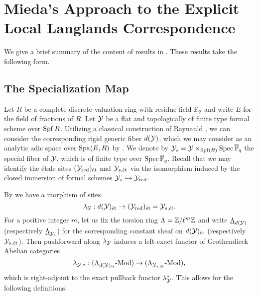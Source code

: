 \documentclass[../main.tex]{subfiles}
\begin{document}
\section{Mieda's Approach to the Explicit Local Langlands Correspondence} %
\label{sec:Mieda's Approach to the Explicit Local Langlands Correspondence}

We give a brief summary of the content of results in \cite{mieda2016geometric}.
These results take the following form. 

\subsection{The Specialization Map} %
\label{sub:The Injectivity FinLevel}
Let $R$ be a complete discrete valuation ring with residue field ${\overline {\mathbb{F}}_q}$ and
write $E$ for the field of fractions of $R$.
Let $\mathcal{Y}$ be a flat and topologically of finite type formal scheme over $\operatorname{Spf} R$.
Utilizing a classical construction of Raynauld \cite{raynaud1974geometrie}, we 
can consider the corresponding rigid generic fiber $d(\mathcal{Y})$, which we may
consider as an analytic adic space over $\operatorname{Spa}(E,R)$ by \cite[Section
1.9]{huber2013etale}. We denote by $\mathcal{Y}_s = \mathcal{Y} \times_{\operatorname{Spf}(R)} \operatorname{Spec}
{\overline {\mathbb{F}}_q}$ the special fiber of $\mathcal{Y}$, which is of finite type over $\operatorname{Spec}
{\overline {\mathbb{F}}_q}$. Recall that we may identify the \'etale sites $(\mathcal{Y}_{\mathrm{red}})_{\textnormal{\'et}}$ and
$\mathcal{Y}_{s,\textnormal{\'et}}$ via the isomorphism induced by the closed immersion of formal schemes
$\mathcal{Y}_s \hookrightarrow \mathcal{Y}_{\mathrm{red}}$.

By \cite[Lemma 3.5.1]{huber2013etale} we have a morphism of sites
\begin{equation*}
  \lambda_{\mathcal{Y}} : d(\mathcal{Y})_{\textnormal{\'et}} \to (\mathcal{Y}_{\mathrm{red}})_{\textnormal{\'et}} = \mathcal{Y}_{s, \textnormal{\'et}}.
\end{equation*}
For a positive integer $m$, let us fix the torsion ring $\Lambda = \mathbb{Z}/\ell^m
\mathbb{Z}$ and write $\underline \Lambda_{d(\mathcal{Y})}$ (respectively $\underline
\Lambda_{\mathcal{Y}_{s}}$)
for the corresponding constant sheaf on $d(\mathcal{Y})_{\textnormal{\'et}}$ (respectively $\mathcal{Y}_{s,\textnormal{\'et}}$). Then 
pushforward along $\lambda_{\mathcal{Y}}$ induces a left-exact functor of Grothendieck
Abelian categories
\begin{equation*}
  \lambda_{\mathcal{Y},*}: {({\underline \Lambda_{d(\mathcal{Y})_{\textnormal{\'et}}}}\text-\allowbreak\mathrm{Mod})} \to {({\underline \Lambda_{\mathcal{Y}_{s, \textnormal{\'et}}}}\text-\allowbreak\mathrm{Mod})},
\end{equation*}
which is right-adjoint to the exact pullback functor $\lambda_{\mathcal{Y}}^*$.
This allows for the following definitions.
\end{document}

